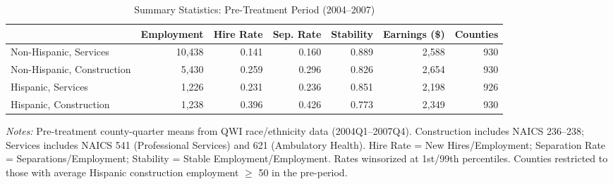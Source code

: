 \begin{table}[H]
\centering
\footnotesize
\begin{threeparttable}
\caption{Summary Statistics: Pre-Treatment Period (2004--2007)}
\label{tab:summary}
\begin{tabular}{lrrrrrr}
\toprule
 & Employment & Hire Rate & Sep. Rate & Stability & Earnings (\$) & Counties \\
\midrule
Non-Hispanic, Services & 10,438 & 0.141 & 0.160 & 0.889 & 2,588 & 930 \\
Non-Hispanic, Construction & 5,430 & 0.259 & 0.296 & 0.826 & 2,654 & 930 \\
Hispanic, Services & 1,226 & 0.231 & 0.236 & 0.851 & 2,198 & 926 \\
Hispanic, Construction & 1,238 & 0.396 & 0.426 & 0.773 & 2,349 & 930 \\
\bottomrule
\end{tabular}
\begin{tablenotes}[flushleft]\footnotesize
\item \textit{Notes:} Pre-treatment county-quarter means from QWI race/ethnicity data (2004Q1--2007Q4). Construction includes NAICS 236--238; Services includes NAICS 541 (Professional Services) and 621 (Ambulatory Health). Hire Rate = New Hires/Employment; Separation Rate = Separations/Employment; Stability = Stable Employment/Employment. Rates winsorized at 1st/99th percentiles. Counties restricted to those with average Hispanic construction employment $\geq$ 50 in the pre-period.
\end{tablenotes}
\end{threeparttable}
\end{table}

